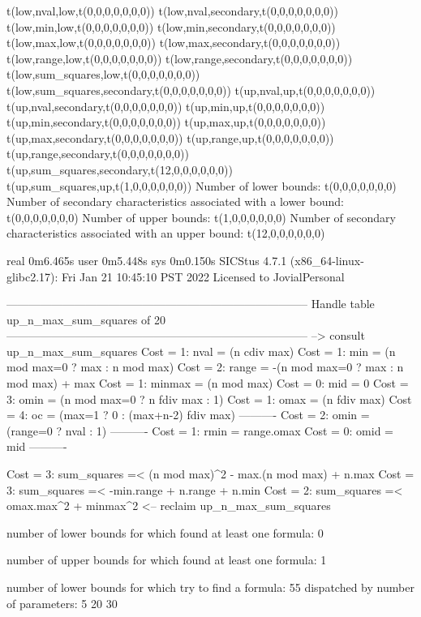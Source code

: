 t(low,nval,low,t(0,0,0,0,0,0,0))
t(low,nval,secondary,t(0,0,0,0,0,0,0))
t(low,min,low,t(0,0,0,0,0,0,0))
t(low,min,secondary,t(0,0,0,0,0,0,0))
t(low,max,low,t(0,0,0,0,0,0,0))
t(low,max,secondary,t(0,0,0,0,0,0,0))
t(low,range,low,t(0,0,0,0,0,0,0))
t(low,range,secondary,t(0,0,0,0,0,0,0))
t(low,sum_squares,low,t(0,0,0,0,0,0,0))
t(low,sum_squares,secondary,t(0,0,0,0,0,0,0))
t(up,nval,up,t(0,0,0,0,0,0,0))
t(up,nval,secondary,t(0,0,0,0,0,0,0))
t(up,min,up,t(0,0,0,0,0,0,0))
t(up,min,secondary,t(0,0,0,0,0,0,0))
t(up,max,up,t(0,0,0,0,0,0,0))
t(up,max,secondary,t(0,0,0,0,0,0,0))
t(up,range,up,t(0,0,0,0,0,0,0))
t(up,range,secondary,t(0,0,0,0,0,0,0))
t(up,sum_squares,secondary,t(12,0,0,0,0,0,0))
t(up,sum_squares,up,t(1,0,0,0,0,0,0))
Number of lower bounds:                                             t(0,0,0,0,0,0,0)
Number of secondary characteristics associated with a lower bound:  t(0,0,0,0,0,0,0)
Number of upper bounds:                                             t(1,0,0,0,0,0,0)
Number of secondary characteristics associated with an upper bound: t(12,0,0,0,0,0,0)

real	0m6.465s
user	0m5.448s
sys	0m0.150s
SICStus 4.7.1 (x86_64-linux-glibc2.17): Fri Jan 21 10:45:10 PST 2022
Licensed to JovialPersonal


--------------------------------------------------------------------------------
Handle table up_n_max_sum_squares of 20
--------------------------------------------------------------------------------
--> consult up_n_max_sum_squares
Cost =  1:  nval   = (n cdiv max)
Cost =  1:  min    = (n mod max=0 ? max : n mod max)
Cost =  2:  range  = -(n mod max=0 ? max : n mod max) + max
Cost =  1:  minmax = (n mod max)
Cost =  0:  mid    = 0
Cost =  3:  omin   = (n mod max=0 ? n fdiv max : 1)
Cost =  1:  omax   = (n fdiv max)
Cost =  4:  oc     = (max=1 ? 0 : (max+n-2) fdiv max)
----------
Cost =  2:  omin   = (range=0 ? nval : 1)
----------
Cost =  1:  rmin   = range.omax
Cost =  0:  omid   = mid
----------

Cost =  3:  sum_squares =< (n mod max)^2 - max.(n mod max) + n.max
Cost =  3:  sum_squares =< -min.range + n.range + n.min
Cost =  2:  sum_squares =< omax.max^2 + minmax^2
<-- reclaim up_n_max_sum_squares

number of lower bounds for which found at least one formula: 0

number of upper bounds for which found at least one formula: 1

number of lower bounds for which try to find a formula: 55
dispatched by number of parameters: 5  20  30

